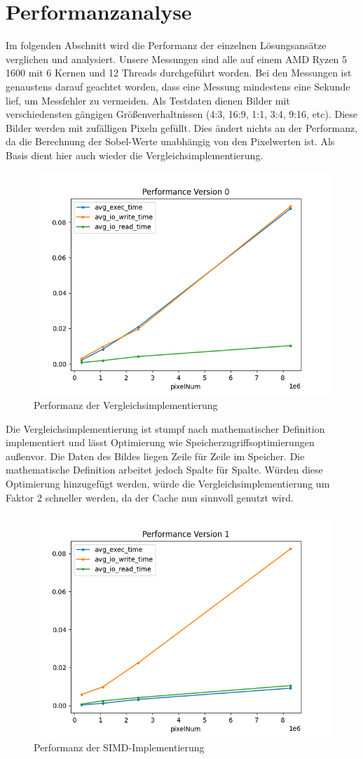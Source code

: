 \documentclass[course=erap]{aspdoc}
\begin{document}
\section{Performanzanalyse}
Im folgenden Abschnitt wird die Performanz der einzelnen Lösungsansätze verglichen und analysiert.
Unsere Messungen sind alle auf einem AMD Ryzen 5 1600 mit 6 Kernen und 12 Threads durchgeführt worden.
Bei den Messungen ist genaustens darauf geachtet worden, dass eine Messung mindestens eine Sekunde lief, um Messfehler zu vermeiden.
Als Testdaten dienen Bilder mit verschiedensten gängigen Größenverhaltnissen (4:3, 16:9, 1:1, 3:4, 9:16, etc).
Diese Bilder werden mit zufälligen Pixeln gefüllt. Dies ändert nichts an der Performanz, da die Berechnung der Sobel-Werte unabhängig von den Pixelwerten ist.
Als Basis dient hier auch wieder die Vergleichsimplementierung.
\begin{figure}[H]
    \centering
    \includegraphics[width=0.5\columnwidth]{graphics/performance_vergleich.png}
    \caption{Performanz der Vergleichsimplementierung}
    \label{fig:performanz}
\end{figure}
Die Vergleichsimplementierung ist stumpf nach mathematischer Definition implementiert und lässt Optimierung wie Speicherzugriffsoptimierungen außenvor.
Die Daten des Bildes liegen Zeile für Zeile im Speicher. Die mathematische Definition arbeitet jedoch Spalte für Spalte.
Würden diese Optimierung hinzugefügt werden, würde die Vergleichsimplementierung um Faktor 2 schneller werden, da der Cache nun sinnvoll genutzt wird.
\begin{figure}[H]
    \centering
    \includegraphics[width=0.5\columnwidth]{graphics/performance_simd.png}
    \caption{Performanz der SIMD-Implementierung}
    \label{fig:performanz-simd}
\end{figure}
\end{document}
